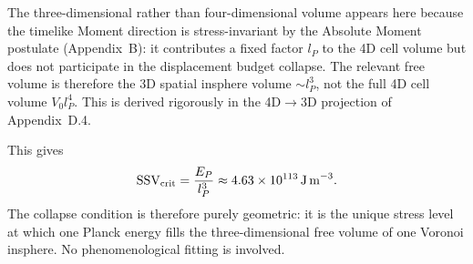 \documentclass[11pt,letterpaper]{article}
\begin{document}
The three-dimensional rather than four-dimensional volume appears here 
because the timelike Moment direction is stress-invariant by the 
Absolute Moment postulate (Appendix~B): it contributes a fixed factor 
$l_P$ to the 4D cell volume but does not participate in the 
displacement budget collapse. The relevant free volume is therefore 
the 3D spatial insphere volume $\sim l_P^3$, not the full 4D cell 
volume $V_0 l_P^4$. This is derived rigorously in the 4D$\to$3D 
projection of Appendix~D.4.

This gives
\begin{equation}
\text{SSV}_{\rm crit} = \frac{E_P}{l_P^3} \approx 4.63 \times 10^{113} \, 
\text{J\,m}^{-3}.
\label{eq:ssv_crit}
\end{equation}
The collapse condition is therefore purely geometric: it is the unique stress 
level at which one Planck energy fills the three-dimensional free volume of one 
Voronoi insphere. No phenomenological fitting is involved.
\end{document}
